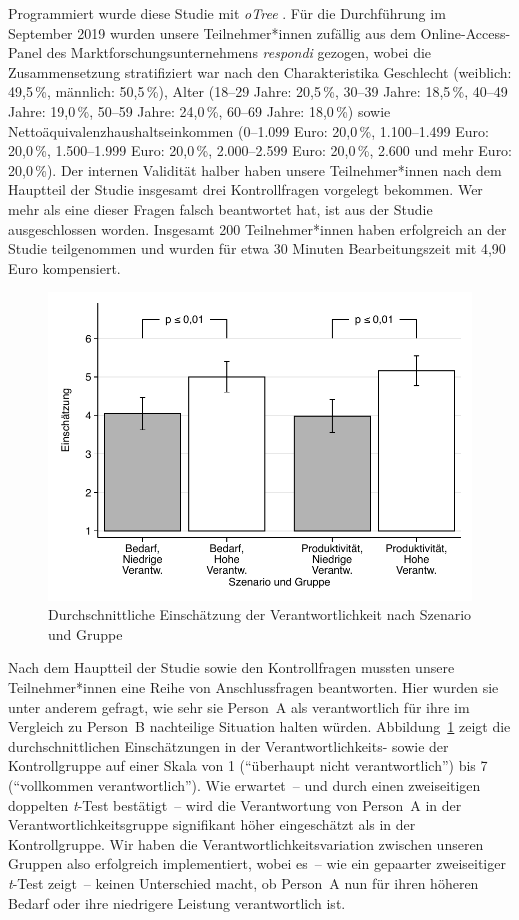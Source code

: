 \documentclass[justified,nobib,symmetric,twoside]{tufte-handout}
\begin{document}
Programmiert wurde diese Studie mit \textit{oTree} \citep{chen_otree_2016}.
Für die Durchführung im September 2019 wurden unsere Teilnehmer*innen zufällig aus dem Online-Access-Panel des Marktforschungsunternehmens \textit{respondi} gezogen, wobei die Zusammensetzung stratifiziert war nach den Charakteristika Geschlecht (weiblich: 49,5\,\%, männlich: 50,5\,\%), Alter (18--29 Jahre: 20,5\,\%, 30--39 Jahre: 18,5\,\%, 40--49 Jahre: 19,0\,\%, 50--59 Jahre: 24,0\,\%, 60--69 Jahre: 18,0\,\%) sowie Nettoäquivalenzhaushaltseinkommen (0--1.099 Euro: 20,0\,\%, 1.100--1.499 Euro: 20,0\,\%, 1.500--1.999 Euro: 20,0\,\%, 2.000--2.599 Euro: 20,0\,\%, 2.600 und mehr Euro: 20,0\,\%).
Der internen Validität halber haben unsere Teilnehmer*innen nach dem Hauptteil der Studie insgesamt drei Kontrollfragen vorgelegt bekommen.
Wer mehr als eine dieser Fragen falsch beantwortet hat, ist aus der Studie ausgeschlossen worden.
Insgesamt 200 Teilnehmer*innen haben erfolgreich an der Studie teilgenommen und wurden für etwa 30 Minuten Bearbeitungszeit mit 4,90 Euro kompensiert.

\begin{figure}[t]\label{fig:abbildung_6}
   \center
   \includegraphics[width=0.99\linewidth]{figure_6.pdf}
   \caption{Durchschnittliche Einschätzung der Verantwortlichkeit nach Szenario und Gruppe}
\end{figure}

Nach dem Hauptteil der Studie sowie den Kontrollfragen mussten unsere Teilnehmer*innen eine Reihe von Anschlussfragen beantworten.
Hier wurden sie unter anderem gefragt, wie sehr sie Person~A als verantwortlich für ihre im Vergleich zu Person~B nachteilige Situation halten würden.
Abbildung~\ref{fig:abbildung_6} zeigt die durchschnittlichen Einschätzungen in der Verantwortlichkeits- sowie der Kontrollgruppe auf einer Skala von 1 (\enquote{überhaupt nicht verantwortlich}) bis 7 (\enquote{vollkommen verantwortlich}).
Wie erwartet~-- und durch einen zweiseitigen doppelten \textit{t}-Test bestätigt~-- wird die Verantwortung von Person~A in der Verantwortlichkeitsgruppe signifikant höher eingeschätzt als in der Kontrollgruppe.
Wir haben die Verantwortlichkeitsvariation zwischen unseren Gruppen also erfolgreich implementiert, wobei es~-- wie ein gepaarter zweiseitiger \textit{t}-Test zeigt~-- keinen Unterschied macht, ob Person~A nun für ihren höheren Bedarf oder ihre niedrigere Leistung verantwortlich ist.
\end{document}
